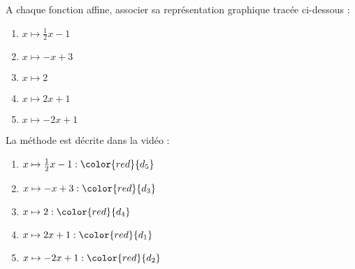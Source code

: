 
%
A chaque fonction affine, associer sa représentation graphique tracée ci-dessous :
\begin{center}
\end{center}
\begin{enumerate}
     \item
     $x \mapsto  \frac{1}{2}x-1$
     \item
     $x \mapsto  -x+3$
     \item
     $x \mapsto  2$
     \item
     $x \mapsto  2x+1$
     \item
     $x \mapsto  -2x+1$
\end{enumerate}
\begin{corrige}
     La méthode est décrite dans la vidéo : 
     \begin{enumerate}
          \item
          $x \mapsto  \frac{1}{2}x-1   :  \color{red}{d_{5}}$
          \item
          $x \mapsto  -x+3   :  \color{red}{d_{3}}$
          \item
          $x \mapsto  2   :  \color{red}{d_{4}}$
          \item
          $x \mapsto  2x+1   :  \color{red}{d_{1}}$
          \item
          $x \mapsto  -2x+1   :  \color{red}{d_{2}}$
     \end{enumerate}
\end{corrige}
